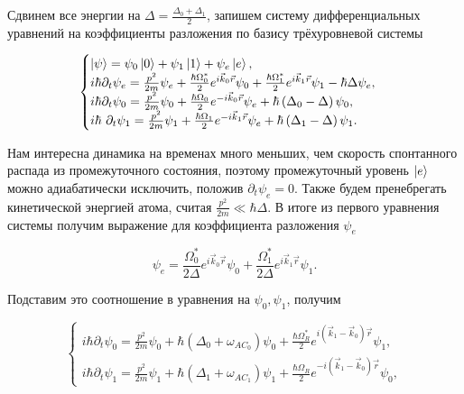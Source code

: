 Сдвинем все энергии на $\Delta=\frac{\Delta_0+\Delta_1}{2}$, запишем систему дифференциальных уравнений на коэффициенты разложения по базису трёхуровневой системы

\begin{equation}
	\begin{cases}
		\left|\psi\right\rangle=\psi_0\ket{0}+\psi_1\ket{1}+\psi_e\ket{e},	\\

		i\hbar\partial_t\psi_e=\frac{p^2}{2m}\psi_e+\frac{\hbar\Omega_0^*}{2}e^{i\vec{k}_0\vec{r}}\psi_0+\frac{\hbar\Omega_1^*}{2}e^{i\vec{k}_1\vec{r}}\psi_1-\hbar\Delta\psi_e,	\\

		i\hbar\partial_t\psi_0=\frac{p^2}{2m}\psi_0+\frac{\hbar\Omega_0}{2}e^{-i\vec{k}_0\vec{r}}\psi_e+\hbar\left(\Delta_0-\Delta\right)\psi_0, \\

		i\hbar\ \partial_t\psi_1=\frac{p^2}{2m}\psi_1+\frac{\hbar\Omega_1}{2}e^{-i\vec{k}_1\vec{r}}\psi_e+\hbar\left(\Delta_1-\Delta\right)\psi_1.
	\end{cases}
\end{equation}

Нам интересна динамика на временах много меньших, чем скорость спонтанного распада из промежуточного состояния, поэтому промежуточный уровень $\left| e \right\rangle$ можно адиабатически исключить, положив $\partial_t\psi_e=0$. Также будем пренебрегать кинетической энергией атома, считая  $\frac{p^2}{2m}\ll\hbar\Delta$. В итоге из первого уравнения системы получим выражение для коэффициента разложения $\psi_e$

\begin{equation}
	\psi_e=\frac{\Omega_0^*}{2\Delta}e^{i\vec{k}_0\vec{r}}\psi_0+\frac{\Omega_1^*}{2\Delta}e^{i\vec{k}_1\vec{r}}\psi_1.
	\label{eq:psie}
\end{equation}

Подставим это соотношение в уравнения на $\psi_0, \psi_1$, получим 

\begin{equation}
	\begin{cases}
		i\hbar \partial_t\psi_{0} = \frac{p^2}{2m}\psi_{0} + \hbar(\Delta_0 + \omega_{AC_0})\psi_{0} + \frac{\hbar \Omega_{R}^*}{2}e^{i(\vec{k}_1-\vec{k}_0)\vec{r}}\psi_{1},\\
		i\hbar \partial_t\psi_{1} = \frac{p^2}{2m}\psi_{1} + \hbar(\Delta_1 + \omega_{AC_1})\psi_{1} + \frac{\hbar \Omega_{R}}{2}e^{-i(\vec{k}_1-\vec{k}_0)\vec{r}}\psi_{0},
	\end{cases}
\end{equation}

